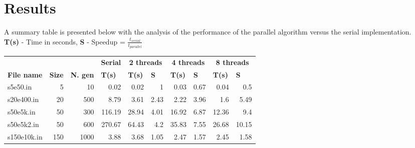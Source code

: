 \documentclass[11pt,english]{article}
\begin{document}
\section{Results}
A summary table is presented below with the analysis of the performance of the parallel algorithm versus the serial implementation.
\\ \textbf{T(s)} - Time in seconds, \textbf{S} - Speedup = $ \frac{t_{serial}}{t_{parallel}}$ \\[2em]
\begin{table}[h]
\centering
\begin{tabular}{lrrrlrrrrrr}
 & \multicolumn{1}{l}{} & \multicolumn{1}{l}{} & \multicolumn{2}{c}{\textbf{Serial}} & \multicolumn{2}{c}{\textbf{2 threads}} & \multicolumn{2}{c}{\textbf{4 threads}} & \multicolumn{2}{c}{\textbf{8 threads}} \\ \cline{4-11}
 
\textbf{File name} & \multicolumn{1}{l}{\textbf{Size}} & \multicolumn{1}{l}{\textbf{N. gen}} & \multicolumn{2}{l}{\textbf{T(s)}} & \multicolumn{1}{l}{\textbf{T(s)}} & \multicolumn{1}{l}{\textbf{S}} & \multicolumn{1}{l}{\textbf{T(s)}} & \multicolumn{1}{l}{\textbf{S}} & \multicolumn{1}{l}{\textbf{T(s)}} & \multicolumn{1}{l}{\textbf{S}} \\ \hline

\multicolumn{1}{l|}{s5e50.in} & \multicolumn{1}{r|}{5} & 
\multicolumn{1}{r|}{10} & 
\multicolumn{2}{r|}{0.02} & 0.02 & \multicolumn{1}{r|}{1} & 0.03 & \multicolumn{1}{r|}{0.67} & 0.04 & 0.5 \\

\multicolumn{1}{l|}{s20e400.in} & \multicolumn{1}{r|}{20} & 
\multicolumn{1}{r|}{500} & 
\multicolumn{2}{r|}{8.79} & 3.61 & \multicolumn{1}{r|}{2.43} & 2.22 & \multicolumn{1}{r|}{3.96} & 1.6 & 5.49 \\

\multicolumn{1}{l|}{s50e5k.in} & \multicolumn{1}{r|}{50} & \multicolumn{1}{r|}{300} & 
\multicolumn{2}{r|}{116.19} & 28.94 & \multicolumn{1}{r|}{4.01} & 16.92 & \multicolumn{1}{r|}{6.87} & 12.36 & 9.4 \\

\multicolumn{1}{l|}{s50e5k2.in} & \multicolumn{1}{r|}{50} & 
\multicolumn{1}{r|}{600} & 
\multicolumn{2}{r|}{270.67} & 64.43 & \multicolumn{1}{r|}{4.2} & 35.83 & \multicolumn{1}{r|}{7.55} & 26.68 & 10.15 \\

\multicolumn{1}{l|}{s150e10k.in} & \multicolumn{1}{r|}{150} & \multicolumn{1}{r|}{1000} & \multicolumn{2}{r|}{3.88} & 3.68 & \multicolumn{1}{r|}{1.05} & 2.47 & \multicolumn{1}{r|}{1.57} & 2.45 & 1.58 \\


\end{tabular}
\end{table}
\end{document}
